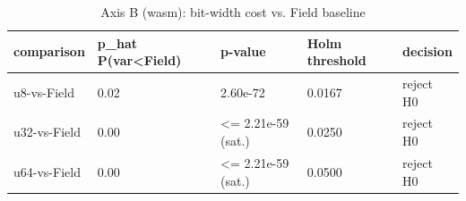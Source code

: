 \begin{table}[htbp]
\centering
\caption{Axis B (wasm): bit-width cost vs. Field baseline}
\label{tab:axis-b-wasm}
\begin{tabular}{lllll}
\toprule
comparison & p_hat P(var<Field) & p-value & Holm threshold & decision \\
\midrule
u8-vs-Field & 0.02 & 2.60e-72 & 0.0167 & reject H0 \\
u32-vs-Field & 0.00 & <= 2.21e-59 (sat.) & 0.0250 & reject H0 \\
u64-vs-Field & 0.00 & <= 2.21e-59 (sat.) & 0.0500 & reject H0 \\
\bottomrule
\end{tabular}
\end{table}
